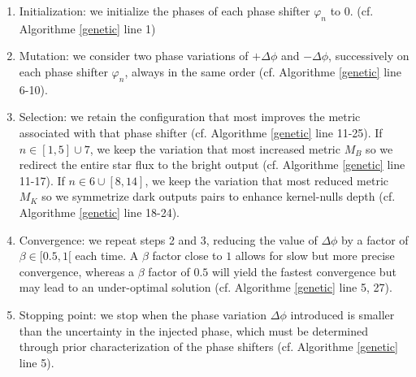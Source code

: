 \documentclass{aa}
\begin{document}
            \begin{enumerate}
                \item Initialization: we initialize the phases of each phase shifter $\varphi_n$ to 0.  (cf. Algorithme \ref{genetic} line 1)
                \item Mutation: we consider two phase variations of $+ \Delta \phi$ and $- \Delta \phi$, successively on each phase shifter $\varphi_n$, always in the same order  (cf. Algorithme \ref{genetic} line 6-10).
                \item Selection: we retain the configuration that most improves the metric associated with that phase shifter (cf. Algorithme \ref{genetic} line 11-25).
                    \subitem If $n \in [1, 5] \cup 7$, we keep the variation that most increased metric $M_B$ so we redirect the entire star flux to the bright output  (cf. Algorithme \ref{genetic} line 11-17).
                    \subitem If $n \in 6 \cup [8, 14]$, we keep the variation that most reduced metric $M_K$ so we symmetrize dark outputs pairs to enhance kernel-nulls depth  (cf. Algorithme \ref{genetic} line 18-24).
                \item Convergence: we repeat steps 2 and 3, reducing the value of $\Delta \phi$ by a factor of $\beta \in [0.5,1[$ each time. A $\beta$ factor close to $1$ allows for slow but more precise convergence, whereas a $\beta$ factor of $0.5$ will yield the fastest convergence but may lead to an under-optimal solution  (cf. Algorithme \ref{genetic} line 5, 27).
                \item Stopping point: we stop when the phase variation $\Delta \phi$ introduced is smaller than the uncertainty in the injected phase, which must be determined through prior characterization of the phase shifters  (cf. Algorithme \ref{genetic} line 5).
            \end{enumerate}
\end{document}
